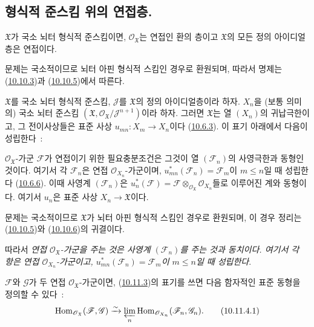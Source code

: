 \subsection{형식적 준스킴 위의 연접층.}
\label{subsection:I.10.11-ko}

\begin{proposition}[10.11.1]
\label{I.10.11.1-ko}
$\mathfrak{X}$가 국소 뇌터 형식적 준스킴이면,
$\mathscr{O}_{\mathfrak{X}}$는 연접인 환의 층이고 $\mathfrak{X}$의
모든 정의 아이디얼층은 연접이다.
\end{proposition}

문제는 국소적이므로 뇌터 아핀 형식적 스킴인 경우로 환원되며, 따라서
명제는 (\hyperref[I.10.10.3-ko]{10.10.3})과
(\hyperref[I.10.10.5-ko]{10.10.5})에서 따른다.

\begin{env}[10.11.2]
\label{I.10.11.2-ko}
$\mathfrak{X}$를 국소 뇌터 형식적 준스킴,
$\mathscr{J}$를 $\mathfrak{X}$의 정의 아이디얼층이라 하자. $X_n$을
(보통 의미의) 국소 뇌터 준스킴
$(\mathfrak{X},\mathscr{O}_{\mathfrak{X}}/\mathscr{J}^{n+1})$이라 하자.
그러면 $\mathfrak{X}$는 열 $(X_n)$의 귀납극한이고, 그 전이사상들은
표준 사상 $u_{mn}:X_m\to X_n$이다
(\hyperref[I.10.6.3-ko]{10.6.3}). 이 표기 아래에서 다음이 성립한다~:
\end{env}

\begin{theorem}[10.11.3]
\label{I.10.11.3-ko}
$\mathscr{O}_{\mathfrak{X}}$-가군 $\mathscr{F}$가 연접이기 위한
필요충분조건은 그것이 열 $(\mathscr{F}_n)$의 사영극한과 동형인 것이다.
여기서 각 $\mathscr{F}_n$은 연접
$\mathscr{O}_{X_n}$-가군이며,
$u_{mn}^*(\mathscr{F}_n)=\mathscr{F}_m$이 $m\leq n$일 때 성립한다
(\hyperref[I.10.6.6-ko]{10.6.6}). 이때 사영계 $(\mathscr{F}_n)$은
$u_n^*(\mathscr{F})=\mathscr{F}
\otimes_{\mathscr{O}_{\mathfrak{X}}}\mathscr{O}_{X_n}$들로 이루어진
계와 동형이다. 여기서 $u_n$은 표준 사상 $X_n\to\mathfrak{X}$이다.
\end{theorem}

문제는 국소적이므로 $\mathfrak{X}$가 뇌터 아핀 형식적 스킴인 경우로
환원되며, 이 경우 정리는 (\hyperref[I.10.10.5-ko]{10.10.5})와
(\hyperref[I.10.10.6-ko]{10.10.6})의 귀결이다.

따라서 \emph{연접 $\mathscr{O}_{\mathfrak{X}}$-가군을 주는 것은
사영계 $(\mathscr{F}_n)$를 주는 것과 동치이다. 여기서 각 항은 연접
$\mathscr{O}_{X_n}$-가군이고,
$u_{mn}^*(\mathscr{F}_n)=\mathscr{F}_m$이 $m\leq n$일 때 성립한다}.

\begin{corollary}[10.11.4]
\label{I.10.11.4-ko}
$\mathscr{F}$와 $\mathscr{G}$가 두 연접
$\mathscr{O}_{\mathfrak{X}}$-가군이면,
(\hyperref[I.10.11.3-ko]{10.11.3})의 표기를 쓰면 다음 함자적인 표준
동형을 정의할 수 있다~:
\[
  \label{I.10.11.4.1-ko}
  \operatorname{Hom}_{\mathscr{O}_{\mathfrak{X}}}
  (\mathscr{F},\mathscr{G})
  \xrightarrow{\sim}
  \varprojlim_n
  \operatorname{Hom}_{\mathscr{O}_{X_n}}
  (\mathscr{F}_n,\mathscr{G}_n).
  \tag{10.11.4.1}
\]
\end{corollary}

